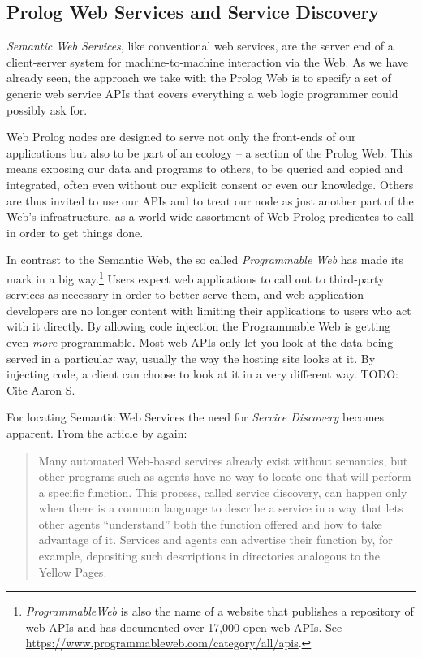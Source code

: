 \documentclass{tlp}
\begin{document}
\subsection{Prolog Web Services and Service Discovery}\label{sec:semantic-web-services}

\noindent \textit{Semantic Web Services}, like conventional web services, are the server end of a client-server system for machine-to-machine interaction via the Web. As we have already seen, the approach we take with the Prolog Web is to specify a set of generic web service APIs that covers everything a web logic programmer could possibly ask for.

Web Prolog nodes are designed to serve not only the front-ends of our applications but also to be part of an ecology -- a section of the Prolog Web. This means exposing our data and programs to others, to be queried and copied and integrated, often even without our explicit consent or even our knowledge. Others are thus invited to use our APIs and to treat our node as just another part of the Web's infrastructure, as a world-wide assortment of Web Prolog predicates to call in order to get things done.

In contrast to the Semantic Web, the so called \textit{Programmable Web} has made its mark in a big way.\footnote{\textit{ProgrammableWeb} is also the name of a website that publishes a repository of web APIs and has documented over 17,000 open web APIs. See \url{https://www.programmableweb.com/category/all/apis}. } Users expect web applications to call out to third-party services as necessary in order to better serve them, and web application developers are no longer content with limiting their applications to users who act with it directly. By allowing code injection the Programmable Web is getting even \textit{more} programmable. Most web APIs only let you look at the data being served in a particular way, usually the way the hosting site looks at it. By injecting code, a client can choose to look at it in a very different way. TODO: Cite Aaron S.

For locating Semantic Web Services the need for \textit{Service Discovery} becomes apparent. From the article by \cite{bernerslee2001semantic} again:

\begin{quote}
Many automated Web-based services already exist without semantics, but other programs such as agents have no way to locate one that will perform a specific function. This process, called service discovery, can happen only when there is a common language to describe a service in a way that lets other agents ``understand'' both the function offered and how to take advantage of it. Services and agents can advertise their function by, for example, depositing such descriptions in directories analogous to the Yellow Pages. 
\end{quote}
\end{document}
